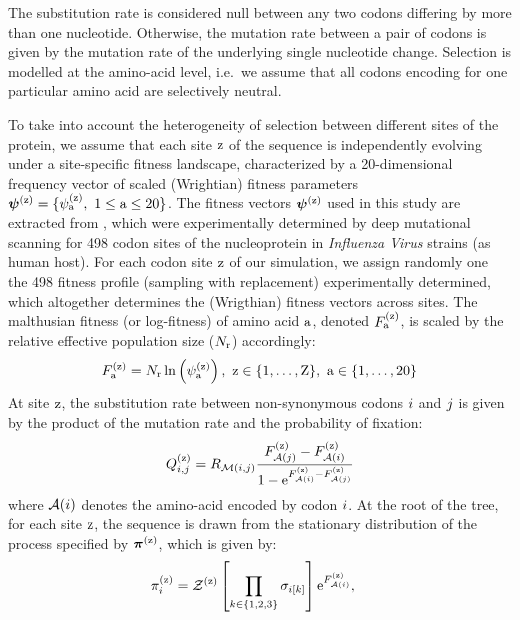 \documentclass{article}
\begin{document}
The {substitution} rate is considered null between any two codons differing by more than one nucleotide.
Otherwise, the mutation rate between a pair of codons is given by the mutation rate of the underlying single nucleotide change.
Selection is modelled at the amino-acid level, i.e.~we assume that all codons encoding for one particular amino acid are selectively {neutral}.

To take into account the heterogeneity of selection between different sites of the protein, we assume that each site $\text{z}$ of the sequence is independently evolving under a site-specific fitness landscape, characterized by a 20-dimensional frequency vector of scaled (Wrightian) fitness parameters $\bm{\psi}^{(\text{z})} = \{ \psi^{(\text{z})}_{\text{a}},\ 1 \leq \text{a} \leq 20 \}$.
The fitness vectors $\bm{\psi}^{(\text{z})}$ used in this study are extracted from \citet{Bloom2017}, which were experimentally determined by deep mutational scanning for 498 codon sites of the nucleoprotein in \textit{Influenza Virus} strains (as human host).
For each {codon} site $\text{z}$ of our simulation, we assign randomly one the 498 fitness profile (sampling with replacement) experimentally determined, which altogether determines the (Wrigthian) fitness vectors across sites.
The malthusian fitness (or log-fitness) of amino acid $\text{a}$, denoted $F^{(\text{z})}_{\text{a}}$, is scaled by the relative effective population size ($N_{\text{r}}$) accordingly:
\begin{equation}
 F^{(\text{z})}_{\text{a}} = N_{\text{r}} \ln \left( \psi^{(\text{z})}_{\text{a}} \right),\ \text{z} \in \{1, \hdots, \text{Z}\}, \ \text{a} \in \{1, \hdots, 20\}
\end{equation}
At site $\text{z}$, the {substitution} rate between {non-synonymous} codons ${i}$ and ${j}$ is given by the product of the mutation rate and the probability of fixation:
\begin{equation}
 Q_{{i}, {j}}^{(\text{z})} = R_{\mathcal{M}({i}, {j})} \dfrac{F_{\mathcal{A}({j})}^{(\text{z})} - F_{\mathcal{A}({i})}^{(\text{z})}}{1 - \text{e}^{F_{\mathcal{A}({i})}^{(\text{z})} - F_{\mathcal{A}({j})}^{(\text{z})}} } \label{eq:codonsubrates}
\end{equation}
where $\mathcal{A}({i})$ denotes the amino-acid encoded by codon ${i}$.
At the root of the tree, for each site $\text{z}$, the sequence is drawn from the stationary distribution of the process specified by $\bm{\pi}^{(\text{z})}$, which is given by:
\begin{align}
 \pi_{{i}}^{(\text{z})} & = \mathcal{Z}^{(\text{z})} \left[\prod\limits_{k \in \{ 1, 2, 3 \}} \sigma_{{i}[k]}\right] \text{e}^{F_{\mathcal{A}({i})}^{(\text{z})}},
 \label{codonStationarity}
\end{align}
\end{document}
